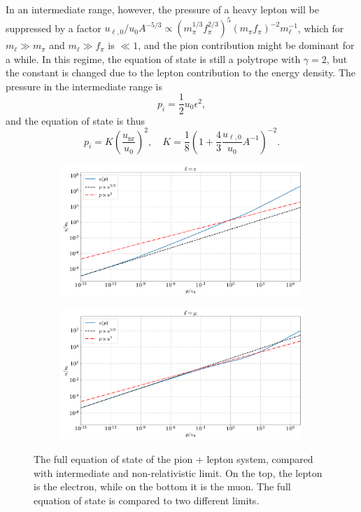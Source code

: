 In an intermediate range, however, the pressure of a heavy lepton will be suppressed by a factor 
$
u_{\ell,0}/ u_0 A^{-5/3}\propto 
(m_\pi^{1/3} f_\pi^{{2}/{3}})^5 (m_\pi f_\pi)^{-2} m_\ell^{-1}
$, 
which for $m_\ell \gg m_\pi$ and $m_\ell \gg f_\pi$ is $\ll 1$, and the pion contribution might be dominant for a while.
In this regime, the equation of state is still a polytrope with $\gamma = 2$, but the constant is changed due to the lepton contribution to the energy density.
The pressure in the intermediate range is
%
\begin{equation}
    p_i = \frac{1}{2} u_0 \epsilon^2,
\end{equation}
%
and the equation of state is thus
%
\begin{equation}
    p_i = K \left(\frac{u_\text{nr}}{u_0}\right)^2, \quad 
    K = \frac{1}{8} \left( 1 + \frac{4}{3} \frac{u_{\ell,0}}{u_0} A^{-1} \right)^{-2}.
\end{equation}

\begin{figure}[!htb]
    \centering
    \begin{subfigure}{0.9\textwidth}
        \includegraphics[width=\textwidth]{../scripts/figurer/charge_neutrality/eos_lepton_limitse.pdf}
    \end{subfigure}
    \begin{subfigure}{0.9\textwidth}
        \includegraphics[width=\textwidth]{../scripts/figurer/charge_neutrality/eos_lepton_limitsmu.pdf}
    \end{subfigure}
    \caption{
        The full equation of state of the pion + lepton system, compared with intermediate and non-relativistic limit.
    On the top, the lepton is the electron, while on the bottom it is the muon.
    The full equation of state is compared to two different limits.
    }
    \label{fig: intermediate regime}
\end{figure}

